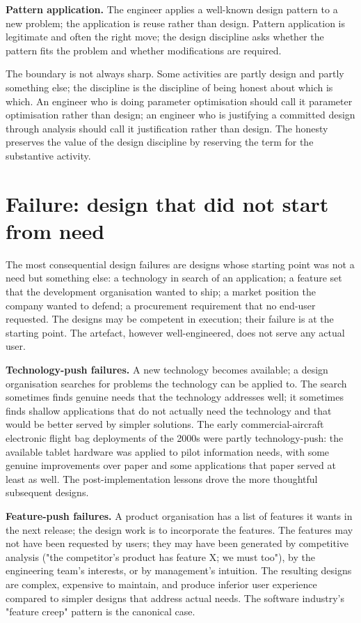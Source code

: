\textbf{Pattern application.} The engineer applies a well-known design pattern to a new problem; the application is reuse rather than design. Pattern application is legitimate and often the right move; the design discipline asks whether the pattern fits the problem and whether modifications are required.

The boundary is not always sharp. Some activities are partly design and partly something else; the discipline is the discipline of being honest about which is which. An engineer who is doing parameter optimisation should call it parameter optimisation rather than design; an engineer who is justifying a committed design through analysis should call it justification rather than design. The honesty preserves the value of the design discipline by reserving the term for the substantive activity.

\section{Failure: design that did not start from need}

The most consequential design failures are designs whose starting point was not a need but something else: a technology in search of an application; a feature set that the development organisation wanted to ship; a market position the company wanted to defend; a procurement requirement that no end-user requested. The designs may be competent in execution; their failure is at the starting point. The artefact, however well-engineered, does not serve any actual user.

\textbf{Technology-push failures.} A new technology becomes available; a design organisation searches for problems the technology can be applied to. The search sometimes finds genuine needs that the technology addresses well; it sometimes finds shallow applications that do not actually need the technology and that would be better served by simpler solutions. The early commercial-aircraft electronic flight bag deployments of the 2000s were partly technology-push: the available tablet hardware was applied to pilot information needs, with some genuine improvements over paper and some applications that paper served at least as well. The post-implementation lessons drove the more thoughtful subsequent designs.

\textbf{Feature-push failures.} A product organisation has a list of features it wants in the next release; the design work is to incorporate the features. The features may not have been requested by users; they may have been generated by competitive analysis ("the competitor's product has feature X; we must too"), by the engineering team's interests, or by management's intuition. The resulting designs are complex, expensive to maintain, and produce inferior user experience compared to simpler designs that address actual needs. The software industry's "feature creep" pattern is the canonical case.

